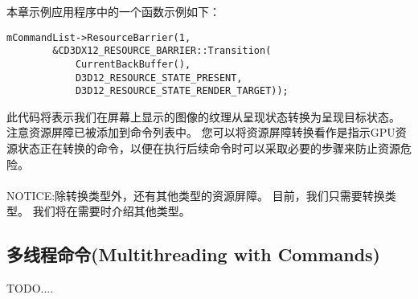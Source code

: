 \begin{flushleft}
本章示例应用程序中的一个函数示例如下：\\
\begin{lstlisting}
mCommandList->ResourceBarrier(1,
        &CD3DX12_RESOURCE_BARRIER::Transition(
            CurrentBackBuffer(),
            D3D12_RESOURCE_STATE_PRESENT,
            D3D12_RESOURCE_STATE_RENDER_TARGET));
\end{lstlisting}
此代码将表示我们在屏幕上显示的图像的纹理从呈现状态转换为呈现目标状态。 注意资源屏障已被添加到命令列表中。 您可以将资源屏障转换看作是指示GPU资源状态正在转换的命令，以便在执行后续命令时可以采取必要的步骤来防止资源危险。\\
~\\
NOTICE:除转换类型外，还有其他类型的资源屏障。 目前，我们只需要转换类型。 我们将在需要时介绍其他类型。
\end{flushleft}
\subsection{多线程命令(Multithreading with Commands)}
TODO....